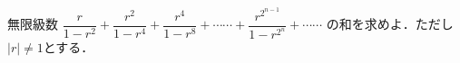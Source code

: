\documentclass[../../main.tex]{subfiles}
\begin{document}
無限級数
$\displaystyle\dfrac{r}{1-r^2}+\dfrac{r^2}{1-r^4}+\dfrac{r^4}{1-r^8}+\cdots\cdots+\dfrac{r^{2^{n-1}}}{1-r^{2^n}}+\cdots\cdots$
の和を求めよ．ただし$|r|\neq1$とする．
\end{document}
